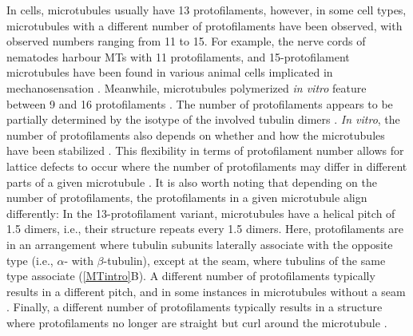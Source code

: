 In cells, microtubules usually have 13 protofilaments, however, in some cell types, microtubules with a different number of protofilaments have been observed, with observed numbers ranging from 11 to 15. For example, the nerve cords of nematodes harbour MTs with 11 protofilaments, and 15-protofilament microtubules have been found in various animal cells implicated in mechanosensation \parencite{Chaaban2017}. Meanwhile, microtubules polymerized \textit{in vitro} feature between 9 and 16 protofilaments \parencite{Chaaban2017}. The number of protofilaments appears to be partially determined by the isotype of the involved tubulin dimers \parencite{Ti2018}. \textit{In vitro}, the number of protofilaments also depends on whether and how the microtubules have been stabilized . This flexibility in terms of protofilament number allows for lattice defects to occur where the number of protofilaments may differ in different parts of a given microtubule . It is also worth noting that depending on the number of protofilaments, the protofilaments in a given microtubule align differently: In the 13-protofilament variant, microtubules have a helical pitch of 1.5 dimers, i.e., their structure repeats every 1.5 dimers. Here, protofilaments are in an arrangement where tubulin subunits laterally associate with the opposite type (i.e., $\alpha$- with $\beta$-tubulin), except at the seam, where tubulins of the same type associate (\autoref{MTintro}B). A different number of protofilaments typically results in a different pitch, and in some instances in microtubules without a seam . Finally, a different number of protofilaments typically results in a structure where protofilaments no longer are straight but curl around the microtubule \parencite{Chaaban2017}.

